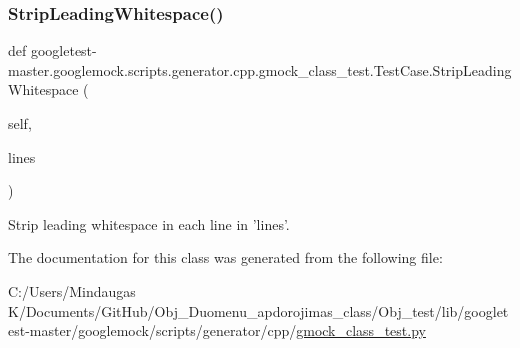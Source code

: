 \subsubsection{\texorpdfstring{StripLeadingWhitespace()}{StripLeadingWhitespace()}}
{\footnotesize\ttfamily def googletest-\/master.\+googlemock.\+scripts.\+generator.\+cpp.\+gmock\+\_\+class\+\_\+test.\+Test\+Case.\+Strip\+Leading\+Whitespace (\begin{DoxyParamCaption}\item[{}]{self,  }\item[{}]{lines }\end{DoxyParamCaption})}

\begin{DoxyVerb}Strip leading whitespace in each line in 'lines'.\end{DoxyVerb}
 

The documentation for this class was generated from the following file\+:\begin{DoxyCompactItemize}
\item 
C\+:/\+Users/\+Mindaugas K/\+Documents/\+Git\+Hub/\+Obj\+\_\+\+Duomenu\+\_\+apdorojimas\+\_\+class/\+Obj\+\_\+test/lib/googletest-\/master/googlemock/scripts/generator/cpp/\mbox{\hyperlink{_obj__test_2lib_2googletest-master_2googlemock_2scripts_2generator_2cpp_2gmock__class__test_8py}{gmock\+\_\+class\+\_\+test.\+py}}\end{DoxyCompactItemize}

